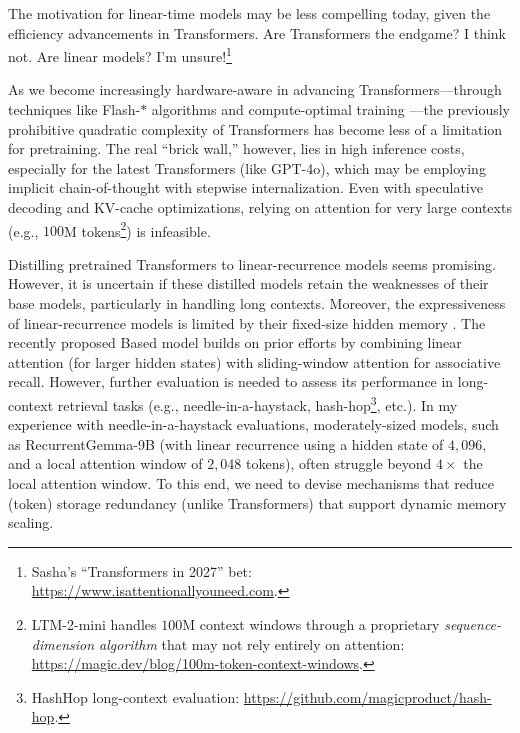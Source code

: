 The motivation for linear-time models may be less compelling today, given the efficiency advancements in Transformers.
%
Are Transformers the endgame? I think not.
%
Are linear models? I'm unsure!\footnote{Sasha's ``Transformers in 2027'' bet: \url{https://www.isattentionallyouneed.com}.}

As we become increasingly hardware-aware in advancing Transformers---through techniques like Flash-$\ast$ algorithms \citep{fu_flashfftconv_2023,shah_flashattention-3_2024} and compute-optimal training \citep{muennighoff_scaling_2023}---the previously prohibitive quadratic complexity of Transformers has become less of a limitation for pretraining.
%
The real ``brick wall,'' however, lies in high inference costs, especially for the latest Transformers (like GPT-4o), which may be employing implicit chain-of-thought with stepwise internalization.
%
Even with speculative decoding and KV-cache optimizations, relying on attention for very large contexts (e.g., $100$M tokens\footnote{LTM-2-mini handles $100$M context windows through a proprietary \textit{sequence-dimension algorithm} that may not rely entirely on attention: \url{https://magic.dev/blog/100m-token-context-windows}.}) is infeasible.

Distilling pretrained Transformers to linear-recurrence models \citep{zhang_hedgehog_2024,wang_mamba_2024,zhang_lolcats_2024,bick_transformers_2024} seems promising.
%
However, it is uncertain if these distilled models retain the weaknesses of their base models, particularly in handling long contexts.
%
Moreover, the expressiveness of linear-recurrence models is limited by their fixed-size hidden memory \citet{jelassi_repeat_2024}.
%
The recently proposed Based model \citep{arora_simple_2024} builds on prior efforts by combining linear attention (for larger hidden states) with sliding-window attention for associative recall.
%
However, further evaluation is needed to assess its performance in long-context retrieval tasks (e.g., needle-in-a-haystack, hash-hop\footnote{HashHop long-context evaluation: \url{https://github.com/magicproduct/hash-hop}.}, etc.).
%
In my experience with needle-in-a-haystack evaluations, moderately-sized models, such as RecurrentGemma-9B (with linear recurrence using a hidden state of $4,096,$ and a local attention window of $2,048$ tokens), often struggle beyond $4\times$ the local attention window.
%
To this end, we need to devise mechanisms that reduce (token) storage redundancy (unlike Transformers) that support dynamic memory scaling.

